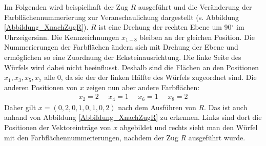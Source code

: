 \documentclass[12pt,a4paper, usenames, dvipsnames]{article}
\theoremstyle{mystyle}
\theoremstyle{definition}
\begin{document}
Im Folgenden wird beispielhaft der Zug $R$ ausgeführt und die Veränderung der Farbflächennummerierung zur Veranschaulichung dargestellt (s. Abbildung \ref{Abbildung_XnachZugR}). $R$ ist eine Drehung der rechten Ebene um 90$^\circ$ im Uhrzeigersinn. 
Die Kennzeichnungen $x_{1-8}$ bleiben an der gleichen Position. Die Nummerierungen  der Farbflächen ändern sich mit Drehung der Ebene und ermöglichen so eine Zuordnung der Ecksteinausrichtung. 
Die linke Seite des Würfels wird dabei nicht beeinflusst. Deshalb sind die Flächen an den Positionen $x_1, x_3, x_5, x_7$ alle 0, da sie der der linken Hälfte des Würfels zugeordnet sind.
Die anderen Positionen von $x$ zeigen nun aber andere Farbflächen: 
\begin{align*}
x_2 = 2 \ \ \ \ \ \ x_4 = 1 \ \ \ \ \ \ x_6 = 1 \ \ \ \ \ \ x_8 = 2  
\end{align*}
Daher gilt $x = (0, 2, 0, 1, 0, 1, 0, 2)$ nach dem Ausführen von $R$. Das ist auch anhand von Abbildung \ref{Abbildung_XnachZugR} zu erkennen. Links sind dort die Positionen der Vektoreinträge von $x$ abgebildet und rechts sieht man den Würfel mit den Farbflächennummerierungen, nachdem der Zug $R$ ausgeführt wurde.
\end{document}
